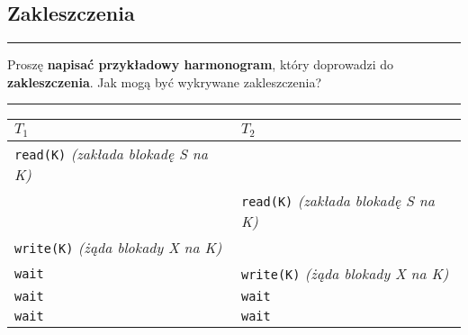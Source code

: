 \documentclass[a5paper,6pt]{article}
\newcommand{\horrule}[1]{\rule{\linewidth}{#1}}
\begin{document}

\pagebreak

    \subsection{Zakleszczenia} %
    \label{sub:zakleszczenia}

    \horrule{0.5pt}
    Proszę \textbf{napisać przykładowy harmonogram}, który doprowadzi do
    \textbf{zakleszczenia}.
    Jak mogą być wykrywane zakleszczenia?\\
    \horrule{0.5pt}

    \begin{center}
    \begin{tabular}{|p{5cm}|p{5cm}|}
        \hline
        \textbf{$T_1$} & \textbf{$T_2$} \\
        \hline
        \texttt{read(K)} \textit{(zakłada blokadę S na K)} & \texttt{}\\
        \texttt{} & \texttt{read(K)} \textit{(zakłada blokadę S na K)}\\
        \texttt{write(K)} \textit{(żąda blokady X na K)} & \texttt{}\\
        \texttt{wait} & \texttt{write(K)} \textit{(żąda blokady X na K)}\\
        \texttt{wait} & \texttt{wait}\\
        \texttt{wait} & \texttt{wait}\\
        \hline
    \end{tabular}
    \end{center}
\end{document}
